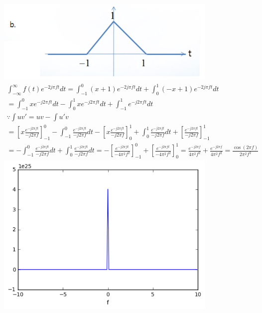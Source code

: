 \documentclass[12pt,a4paper]{article}
\begin{document}
\includegraphics[width=0.8\textwidth]{b.png}
\begin{gather*}
\int_{-\infty}^{\infty}f(t)e^{-2j\pi ft}dt
=\int_{-1}^{0}(x+1)e^{-2j\pi ft}dt + \int_{0}^{1}(-x+1)e^{-2j\pi ft}dt\\
=\int_{-1}^{0}xe^{-j2\pi ft}dt - \int_{0}^{1}xe^{-j2\pi ft}dt + \int_{-1}^{1}e^{-j2\pi ft}dt\\
\because \int uv' = uv - \int u'v\\
=\left[x\frac{e^{-j2\pi ft}}{-j2\pi f}\right]_{-1}^0 - \int_{-1}^{0}\frac{e^{-j2\pi ft}}{-j2\pi f}dt
-\left[x\frac{e^{-j2\pi ft}}{-j2\pi f}\right]_{0}^1 + \int_{0}^{1}\frac{e^{-j2\pi ft}}{-j2\pi f}dt
+\left[\frac{e^{-j2\pi ft}}{-j2\pi f}\right]_{-1}^1\\
=-\int_{-1}^{0}\frac{e^{-j2\pi ft}}{-j2\pi f}dt  +
\int_{0}^{1}\frac{e^{-j2\pi ft}}{-j2\pi f}dt
=-\left[\frac{e^{-j2\pi ft}}{-4\pi^2f^2}\right]_{-1}^0 + 
\left[\frac{e^{-j2\pi ft}}{-4\pi^2 f^2}\right]_0^1
=\frac{e^{-j2\pi f}}{4\pi^2f^2} + \frac{e^{-j2\pi f}}{4\pi^2 f^2}
=\frac{\cos(2\pi f)}{2\pi^2 f^2}
\end{gather*}
\includegraphics[width=0.8\textwidth]{4.png}
\end{document}

